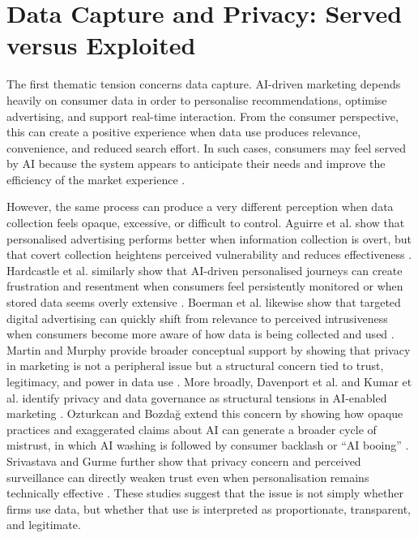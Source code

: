 \section{Data Capture and Privacy: Served versus Exploited}
The first thematic tension concerns data capture. AI-driven marketing depends heavily on consumer data in order to personalise recommendations, optimise advertising, and support real-time interaction. From the consumer perspective, this can create a positive experience when data use produces relevance, convenience, and reduced search effort. In such cases, consumers may feel served by AI because the system appears to anticipate their needs and improve the efficiency of the market experience \cite{an2025personalized,ameen2021customer}.

However, the same process can produce a very different perception when data collection feels opaque, excessive, or difficult to control. Aguirre et al. show that personalised advertising performs better when information collection is overt, but that covert collection heightens perceived vulnerability and reduces effectiveness \cite{aguirre2015paradox}. Hardcastle et al. similarly show that AI-driven personalised journeys can create frustration and resentment when consumers feel persistently monitored or when stored data seems overly extensive \cite{hardcastle2025journeys}. Boerman et al. likewise show that targeted digital advertising can quickly shift from relevance to perceived intrusiveness when consumers become more aware of how data is being collected and used \cite{boerman2017oba}. Martin and Murphy provide broader conceptual support by showing that privacy in marketing is not a peripheral issue but a structural concern tied to trust, legitimacy, and power in data use \cite{martin2017privacy}. More broadly, Davenport et al. and Kumar et al. identify privacy and data governance as structural tensions in AI-enabled marketing \cite{davenport2020future,kumar2024aipowered}. Ozturkcan and Bozda{\u{g}} extend this concern by showing how opaque practices and exaggerated claims about AI can generate a broader cycle of mistrust, in which AI washing is followed by consumer backlash or ``AI booing'' \cite{ozturkcan2025mistrust}. Srivastava and Gurme further show that privacy concern and perceived surveillance can directly weaken trust even when personalisation remains technically effective \cite{srivastava2026social}. These studies suggest that the issue is not simply whether firms use data, but whether that use is interpreted as proportionate, transparent, and legitimate.

